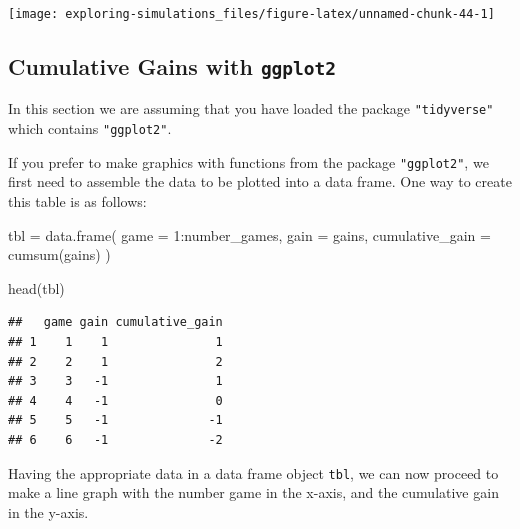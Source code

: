 \documentclass[
]{book}
\newenvironment{Shaded}{\begin{snugshade}}{\end{snugshade}}
\newcommand{\AttributeTok}[1]{\textcolor[rgb]{0.77,0.63,0.00}{#1}}
\newcommand{\DecValTok}[1]{\textcolor[rgb]{0.00,0.00,0.81}{#1}}
\newcommand{\FunctionTok}[1]{\textcolor[rgb]{0.00,0.00,0.00}{#1}}
\newcommand{\NormalTok}[1]{#1}
\newcommand{\OtherTok}[1]{\textcolor[rgb]{0.56,0.35,0.01}{#1}}
\newcommand{\SpecialCharTok}[1]{\textcolor[rgb]{0.00,0.00,0.00}{#1}}
\begin{document}
\begin{center}\texttt{[image: exploring-simulations\_files/figure-latex/unnamed-chunk-44-1]} \end{center}

\hypertarget{cumulative-gains-with-ggplot2}{%
\subsection{\texorpdfstring{Cumulative Gains with \texttt{ggplot2}}{Cumulative Gains with ggplot2}}\label{cumulative-gains-with-ggplot2}}

In this section we are assuming that you have loaded the package \texttt{"tidyverse"}
which contains \texttt{"ggplot2"}.

If you prefer to make graphics with functions from the package \texttt{"ggplot2"},
we first need to assemble the data to be plotted into a data frame. One way to
create this table is as follows:

\begin{Shaded}
\begin{Highlighting}[]
\NormalTok{tbl }\OtherTok{=} \FunctionTok{data.frame}\NormalTok{(}
  \AttributeTok{game =} \DecValTok{1}\SpecialCharTok{:}\NormalTok{number\_games,}
  \AttributeTok{gain =}\NormalTok{ gains,}
  \AttributeTok{cumulative\_gain =} \FunctionTok{cumsum}\NormalTok{(gains)}
\NormalTok{)}

\FunctionTok{head}\NormalTok{(tbl)}
\end{Highlighting}
\end{Shaded}

\begin{verbatim}
##   game gain cumulative_gain
## 1    1    1               1
## 2    2    1               2
## 3    3   -1               1
## 4    4   -1               0
## 5    5   -1              -1
## 6    6   -1              -2
\end{verbatim}

Having the appropriate data in a data frame object \texttt{tbl}, we can now proceed
to make a line graph with the number game in the x-axis, and the cumulative
gain in the y-axis.
\end{document}
